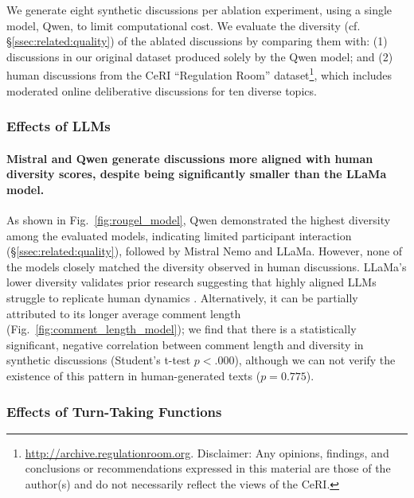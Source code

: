 We generate eight synthetic discussions per ablation experiment, using a single model, Qwen, to limit computational cost. We evaluate the diversity (cf. \S\ref{ssec:related:quality}) of the ablated discussions by comparing them with: (1) discussions in our original dataset produced solely by the Qwen model; and (2) human discussions from the \ac{CeRI} “Regulation Room” dataset\footnote{\url{http://archive.regulationroom.org}. Disclaimer: Any opinions, findings, and conclusions or recommendations expressed in this material are those of the author(s) and do not necessarily reflect the views of the \ac{CeRI}.}, which includes moderated online deliberative discussions for ten diverse topics.


\subsubsection{Effects of LLMs}

\paragraph{Mistral and Qwen generate discussions more aligned with human diversity scores, despite being significantly smaller than the LLaMa model.} As shown in Fig.~\ref{fig:rougel_model}, Qwen demonstrated the highest diversity among the evaluated models, indicating limited participant interaction (\S\ref{ssec:related:quality}), followed by Mistral Nemo and LLaMa. However, none of the models closely matched the diversity observed in human discussions. 
LLaMa's lower diversity validates prior research suggesting that highly aligned \acp{LLM} struggle to replicate human dynamics \cite{Park2023GenerativeAI, leng_2024}. Alternatively, it can be partially attributed to its longer average comment length (Fig.~\ref{fig:comment_length_model}); we find that there is a statistically significant, negative correlation between comment length and diversity in synthetic discussions (Student's t-test  $p < .000$), although we can not verify the existence of this pattern in human-generated texts ($p = 0.775$).


\subsubsection{Effects of Turn-Taking Functions}

